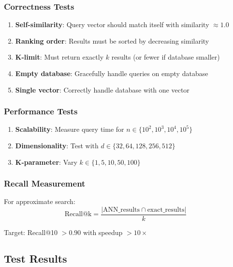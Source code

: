 \documentclass[12pt,a4paper]{article}
\begin{document}
\subsubsection{Correctness Tests}
\begin{enumerate}
    \item \textbf{Self-similarity}: Query vector should match itself with similarity $\approx 1.0$
    \item \textbf{Ranking order}: Results must be sorted by decreasing similarity
    \item \textbf{K-limit}: Must return exactly $k$ results (or fewer if database smaller)
    \item \textbf{Empty database}: Gracefully handle queries on empty database
    \item \textbf{Single vector}: Correctly handle database with one vector
\end{enumerate}

\subsubsection{Performance Tests}
\begin{enumerate}
    \item \textbf{Scalability}: Measure query time for $n \in \{10^2, 10^3, 10^4, 10^5\}$
    \item \textbf{Dimensionality}: Test with $d \in \{32, 64, 128, 256, 512\}$
    \item \textbf{K-parameter}: Vary $k \in \{1, 5, 10, 50, 100\}$
\end{enumerate}

\subsubsection{Recall Measurement}
For approximate search:
\begin{equation}
\text{Recall@k} = \frac{|\text{ANN\_results} \cap \text{exact\_results}|}{k}
\end{equation}








Target: Recall@10 $> 0.90$ with speedup $> 10\times$

\subsection{Test Results}
\end{document}
